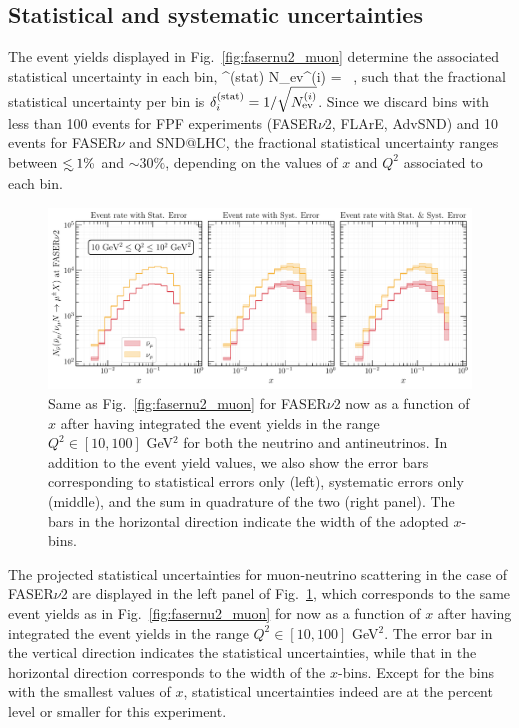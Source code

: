 \subsection{Statistical and systematic uncertainties}
\label{subsec:uncertainties}

The event yields displayed in Fig.~\ref{fig:fasernu2_muon} determine the associated statistical uncertainty 
in each bin,
\be
\label{eq:statistical_uncertainties}
\delta^{\rm (stat)}  N_{\rm ev}^{(i)} =  \, ,
\ee
such that the fractional statistical uncertainty per bin is $\delta^{\rm (stat)}_i=1/\sqrt{N_{\rm ev}^{(i)}}$.
%
Since we discard bins with less than 100 events for FPF experiments (FASER$\nu$2, FLArE, AdvSND) and
10 events for FASER$\nu$ and SND@LHC, the fractional statistical uncertainty
ranges between $\lsim 1\%$ and $\sim 30\%$, depending on the values of
$x$ and $Q^2$ associated to each bin.

\begin{figure}[h]
    \centering
    \includegraphics[width = \textwidth]{plots/Event_Rate_FASERv2.pdf}
    \caption{Same as Fig.~\ref{fig:fasernu2_muon} for FASER$\nu$2
      now as a function of $x$ after having integrated the event yields in the range $Q^2 \in [10,100]$ GeV$^2$
      for both the neutrino and antineutrinos.
      In addition to the event yield values, we also show the error bars corresponding to
      statistical errors only (left), systematic errors only (middle), and the
      sum in quadrature of the two (right panel).
      The bars in the horizontal direction indicate the width of the adopted $x$-bins.
      }
    \label{fig:error_plot_FASERv2_14}
\end{figure}

The projected statistical uncertainties for muon-neutrino scattering
in the case of FASER$\nu$2 are displayed in the left panel
of Fig.~\ref{fig:error_plot_FASERv2_14}, which corresponds
to the same event yields as in
Fig.~\ref{fig:fasernu2_muon} for 
now as a function of $x$ after having integrated the event
yields in the range $Q^2 \in [10,100]$ GeV$^2$.
%
The error bar in the vertical direction indicates the statistical uncertainties, while
that in the horizontal direction corresponds to the width of the $x$-bins.
%
Except for the bins with the smallest values of $x$, statistical uncertainties indeed
are at the percent level or smaller for this experiment.

